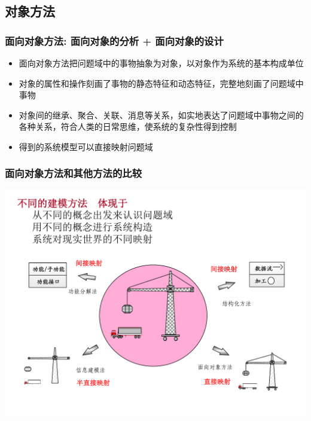 \documentclass[compress]{beamer}
\begin{document}
\subsection{对象方法}

\begin{frame}
  \frametitle{面向对象方法: 面向对象的分析 + 面向对象的设计}
  \begin{itemize}
    \item 面向对象方法把问题域中的事物抽象为对象，以对象作为系统的基本构成单位
    \item 对象的属性和操作刻画了事物的静态特征和动态特征，完整地刻画了问题域中事物
    \item 对象间的继承、聚合、关联、消息等关系，如实地表达了问题域中事物之间的各种关系，符合人类的日常思维，使系统的复杂性得到控制
    \item 得到的系统模型可以直接映射问题域
  \end{itemize}
\end{frame}

\begin{frame}
\frametitle{面向对象方法和其他方法的比较}
\begin{center}
\centering\includegraphics[width=1.0\hsize]{mapping.pdf}
\end{center}
\end{frame}
\end{document}
